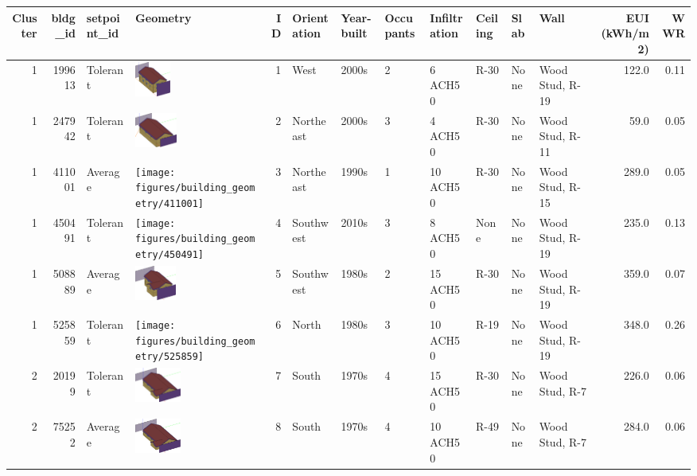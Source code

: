 \begin{tabular}{rrllrlllllllrr}
\toprule
 Cluster & bldg_id & setpoint_id & Geometry & ID & Orientation & Year-built & Occupants & Infiltration & Ceiling & Slab & Wall & EUI (kWh/m2) & WWR \\
\midrule
 1 & 199613 & Tolerant & {\includegraphics[height=0.45in]{figures/building_geometry/199613}} & 1 & West & 2000s & 2 & 6 ACH50 & R-30 & None & Wood Stud, R-19 & 122.0 & 0.11 \\
 1 & 247942 & Tolerant & {\includegraphics[height=0.45in]{figures/building_geometry/247942}} & 2 & Northeast & 2000s & 3 & 4 ACH50 & R-30 & None & Wood Stud, R-11 & 59.0 & 0.05 \\
 1 & 411001 & Average & {\texttt{[image: figures/building\_geometry/411001]}} & 3 & Northeast & 1990s & 1 & 10 ACH50 & R-30 & None & Wood Stud, R-15 & 289.0 & 0.05 \\
 1 & 450491 & Tolerant & {\texttt{[image: figures/building\_geometry/450491]}} & 4 & Southwest & 2010s & 3 & 8 ACH50 & None & None & Wood Stud, R-19 & 235.0 & 0.13 \\
 1 & 508889 & Average & {\includegraphics[height=0.45in]{figures/building_geometry/508889}} & 5 & Southwest & 1980s & 2 & 15 ACH50 & R-30 & None & Wood Stud, R-19 & 359.0 & 0.07 \\
 1 & 525859 & Tolerant & {\texttt{[image: figures/building\_geometry/525859]}} & 6 & North & 1980s & 3 & 10 ACH50 & R-19 & None & Wood Stud, R-19 & 348.0 & 0.26 \\
 2 & 20199 & Tolerant & {\includegraphics[height=0.45in]{figures/building_geometry/20199}} & 7 & South & 1970s & 4 & 15 ACH50 & R-30 & None & Wood Stud, R-7 & 226.0 & 0.06 \\
 2 & 75252 & Average & {\includegraphics[height=0.45in]{figures/building_geometry/75252}} & 8 & South & 1970s & 4 & 10 ACH50 & R-49 & None & Wood Stud, R-7 & 284.0 & 0.06 \\

\end{tabular}
